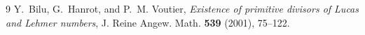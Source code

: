 \documentclass[11pt]{amsart}
\theoremstyle{remark}
\begin{document}

\begin{thebibliography}{9}
Y.~Bilu, G.~Hanrot, and P.~M. Voutier,
\emph{Existence of primitive divisors of Lucas and Lehmer numbers},
J. Reine Angew. Math. \textbf{539} (2001), 75--122.
\end{thebibliography}
\end{document}
